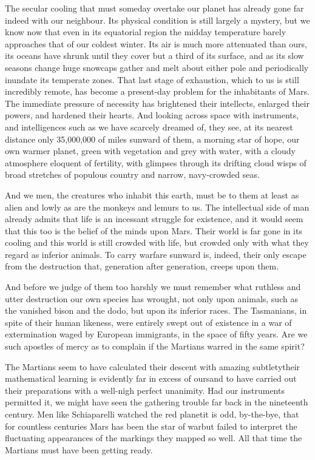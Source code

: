 The secular cooling that must someday overtake our planet has
already gone far indeed with our neighbour. Its physical condition
is still largely a mystery, but we know now that even in its
equatorial region the midday temperature barely approaches that of
our coldest winter. Its air is much more attenuated than ours, its
oceans have shrunk until they cover but a third of its surface, and
as its slow seasons change huge snowcaps gather and melt about
either pole and periodically inundate its temperate zones. That
last stage of exhaustion, which to us is still incredibly remote,
has become a present-day problem for the inhabitants of Mars. The
immediate pressure of necessity has brightened their intellects,
enlarged their powers, and hardened their hearts. And looking
across space with instruments, and intelligences such as we have
scarcely dreamed of, they see, at its nearest distance only
35,000,000 of miles sunward of them, a morning star of hope, our
own warmer planet, green with vegetation and grey with water, with
a cloudy atmosphere eloquent of fertility, with glimpses through
its drifting cloud wisps of broad stretches of populous country and
narrow, navy-crowded seas.

And we men, the creatures who inhabit this earth, must be to them
at least as alien and lowly as are the monkeys and lemurs to us.
The intellectual side of man already admits that life is an
incessant struggle for existence, and it would seem that this too
is the belief of the minds upon Mars. Their world is far gone in
its cooling and this world is still crowded with life, but crowded
only with what they regard as inferior animals. To carry warfare
sunward is, indeed, their only escape from the destruction that,
generation after generation, creeps upon them.

And before we judge of them too harshly we must remember what
ruthless and utter destruction our own species has wrought, not
only upon animals, such as the vanished bison and the dodo, but
upon its inferior races. The Tasmanians, in spite of their human
likeness, were entirely swept out of existence in a war of
extermination waged by European immigrants, in the space of fifty
years. Are we such apostles of mercy as to complain if the Martians
warred in the same spirit?

The Martians seem to have calculated their descent with amazing
subtlety\dash{}their mathematical learning is evidently far in excess of
ours\dash{}and to have carried out their preparations with a well-nigh
perfect unanimity. Had our instruments permitted it, we might have
seen the gathering trouble far back in the nineteenth century. Men
like Schiaparelli watched the red planet\dash{}it is odd, by-the-bye,
that for countless centuries Mars has been the star of war\dash{}but
failed to interpret the fluctuating appearances of the markings
they mapped so well. All that time the Martians must have been
getting ready.

